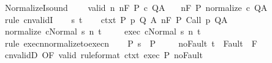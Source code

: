 \begin{isabellebody}
%
\endisatagproof
{\isafoldproof}%
%
\isadelimproof
\isanewline
%
\endisadelimproof
\isanewline
{}\isamarkupfalse%
\ NormalizeI{\isacharunderscore}sound{\isacharcolon}\ \isanewline
\ \ \ valid{\isacharcolon}\ {\isachardoublequoteopen}{\isasymforall}n{\isachardot}\ {\isasymGamma}{\isacharcomma}{\isasymTheta}{\isasymTurnstile}n{\isacharcolon}\isactrlbsub {\isacharslash}F\isactrlesub \ P\ c\ Q{\isacharcomma}A{\isachardoublequoteclose}\isanewline
\ \ \ {\isachardoublequoteopen}{\isasymGamma}{\isacharcomma}{\isasymTheta}{\isasymTurnstile}n{\isacharcolon}\isactrlbsub {\isacharslash}F\isactrlesub \ P\ {\isacharparenleft}normalize\ c{\isacharparenright}\ Q{\isacharcomma}A{\isachardoublequoteclose}\isanewline
%
\isadelimproof
%
\endisadelimproof
%
\isatagproof
{}\isamarkupfalse%
\ {\isacharparenleft}rule\ cnvalidI{\isacharparenright}\isanewline
\ \ \isamarkupfalse%
\ s\ t\isanewline
\ \ \isamarkupfalse%
\ ctxt{\isacharcolon}\ {\isachardoublequoteopen}{\isasymforall}{\isacharparenleft}P{\isacharcomma}\ p{\isacharcomma}\ Q{\isacharcomma}\ A{\isacharparenright}{\isasymin}{\isasymTheta}{\isachardot}\ {\isasymGamma}{\isasymTurnstile}n{\isacharcolon}\isactrlbsub {\isacharslash}F\isactrlesub \ P\ {\isacharparenleft}Call\ p{\isacharparenright}\ Q{\isacharcomma}A{\isachardoublequoteclose}\ \isanewline
\ \ \isamarkupfalse%
\ {\isachardoublequoteopen}{\isasymGamma}{\isasymturnstile}{\isasymlangle}normalize\ c{\isacharcomma}Normal\ s{\isasymrangle}\ {\isacharequal}n{\isasymRightarrow}\ t{\isachardoublequoteclose}\ \isanewline
\ \ \isamarkupfalse%
\ exec{\isacharcolon}\ {\isachardoublequoteopen}{\isasymGamma}{\isasymturnstile}{\isasymlangle}c{\isacharcomma}Normal\ s{\isasymrangle}\ {\isacharequal}n{\isasymRightarrow}\ t{\isachardoublequoteclose}\ \isanewline
\ \ \ \ \isamarkupfalse%
\ {\isacharparenleft}rule\ execn{\isacharunderscore}normalize{\isacharunderscore}to{\isacharunderscore}execn{\isacharparenright}\isanewline
\ \ \isamarkupfalse%
\ P{\isacharcolon}\ {\isachardoublequoteopen}s\ {\isasymin}\ P{\isachardoublequoteclose}\ \isanewline
\ \ \isamarkupfalse%
\ noFault{\isacharcolon}\ {\isachardoublequoteopen}t\ {\isasymnotin}\ Fault\ {\isacharbackquote}\ F{\isachardoublequoteclose}\isanewline
\ \ \isamarkupfalse%
\ cnvalidD\ {\isacharbrackleft}OF\ valid\ {\isacharbrackleft}rule{\isacharunderscore}format{\isacharbrackright}\ ctxt\ exec\ P\ noFault{\isacharbrackright}\isanewline

\end{isabellebody}
